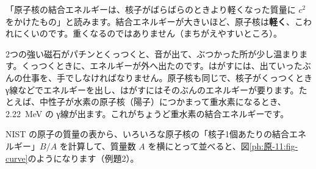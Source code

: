 \begin{phflow}[$E=mc^2$ から、結合エネルギーへ]
\end{phflow}

\begin{phyomi}[$B=\Delta m\,c^2$]
「原子核の結合エネルギーは、核子がばらばらのときより軽くなった質量に $c^2$ をかけたもの」と読みます。結合エネルギーが大きいほど、原子核は\textbf{軽く}、こわれにくいのです。重くなるのではありません（まちがえやすいところ）。
\end{phyomi}

\begin{phmijika}[くっついた磁石]
2つの強い磁石がパチンとくっつくと、音が出て、ぶつかった所が少し温まります。くっつくときに、エネルギーが外へ出たのです。はがすには、出ていったぶんの仕事を、手でしなければなりません。原子核も同じで、核子がくっつくとき γ線などでエネルギーを出し、はがすにはそのぶんのエネルギーが要ります。たとえば、中性子が水素の原子核（陽子）につかまって重水素になるとき、\qty{2.22}{MeV} の γ線が出ます。これがちょうど重水素の結合エネルギーです。
\end{phmijika}

\label{ph:原-11:sec5}
NIST の原子の質量の表から、いろいろな原子核の「核子1個あたりの結合エネルギー」$B/A$ を計算して、質量数 $A$ を横にとって並べると、図\ref{ph:原-11:fig-curve}のようになります（例題2）。


